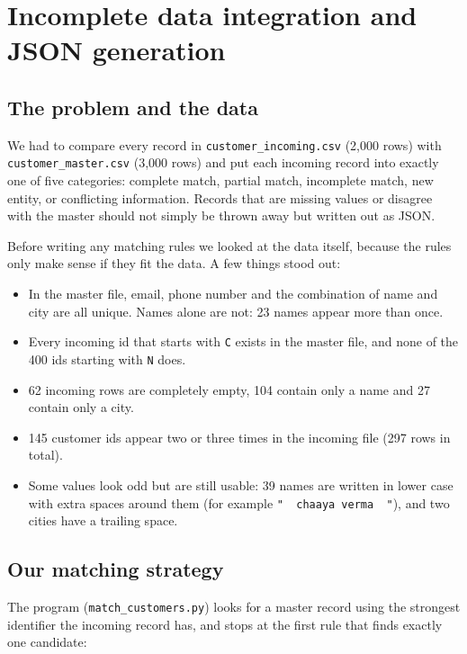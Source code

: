 \documentclass[11pt,a4paper]{article}
\newcommand{\file}[1]{\texttt{#1}}
\begin{document}
\section{Incomplete data integration and JSON generation}
\label{sec:p2}

\subsection{The problem and the data}

We had to compare every record in \file{customer\_incoming.csv} (2{,}000 rows)
with \file{customer\_master.csv} (3{,}000 rows) and put each incoming record
into exactly one of five categories: complete match, partial match,
incomplete match, new entity, or conflicting information. Records that are
missing values or disagree with the master should not simply be thrown away
but written out as JSON.

Before writing any matching rules we looked at the data itself, because the
rules only make sense if they fit the data. A few things stood out:

\begin{itemize}
\item In the master file, email, phone number and the combination of name
and city are all unique. Names alone are not: 23 names appear more than once.
\item Every incoming id that starts with \file{C} exists in the master file,
and none of the 400 ids starting with \file{N} does.
\item 62 incoming rows are completely empty, 104 contain only a name and 27
contain only a city.
\item 145 customer ids appear two or three times in the incoming file
(297 rows in total).
\item Some values look odd but are still usable: 39 names are written in lower
case with extra spaces around them (for example \file{"~~chaaya verma~~"}),
and two cities have a trailing space.
\end{itemize}

\subsection{Our matching strategy}

The program (\file{match\_customers.py}) looks for a master record using the
strongest identifier the incoming record has, and stops at the first rule
that finds exactly one candidate:
\end{document}
